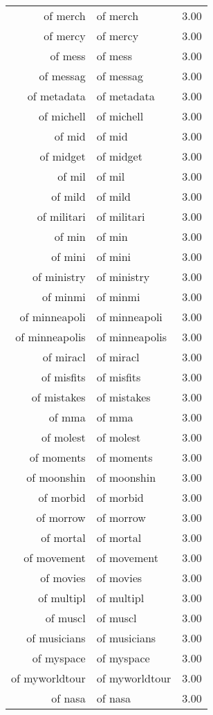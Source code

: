 \begin{table}[ht]
\begin{tabular}{rlr}
  of merch & of merch & 3.00 \\ 
  of mercy & of mercy & 3.00 \\ 
  of mess & of mess & 3.00 \\ 
  of messag & of messag & 3.00 \\ 
  of metadata & of metadata & 3.00 \\ 
  of michell & of michell & 3.00 \\ 
  of mid & of mid & 3.00 \\ 
  of midget & of midget & 3.00 \\ 
  of mil & of mil & 3.00 \\ 
  of mild & of mild & 3.00 \\ 
  of militari & of militari & 3.00 \\ 
  of min & of min & 3.00 \\ 
  of mini & of mini & 3.00 \\ 
  of ministry & of ministry & 3.00 \\ 
  of minmi & of minmi & 3.00 \\ 
  of minneapoli & of minneapoli & 3.00 \\ 
  of minneapolis & of minneapolis & 3.00 \\ 
  of miracl & of miracl & 3.00 \\ 
  of misfits & of misfits & 3.00 \\ 
  of mistakes & of mistakes & 3.00 \\ 
  of mma & of mma & 3.00 \\ 
  of molest & of molest & 3.00 \\ 
  of moments & of moments & 3.00 \\ 
  of moonshin & of moonshin & 3.00 \\ 
  of morbid & of morbid & 3.00 \\ 
  of morrow & of morrow & 3.00 \\ 
  of mortal & of mortal & 3.00 \\ 
  of movement & of movement & 3.00 \\ 
  of movies & of movies & 3.00 \\ 
  of multipl & of multipl & 3.00 \\ 
  of muscl & of muscl & 3.00 \\ 
  of musicians & of musicians & 3.00 \\ 
  of myspace & of myspace & 3.00 \\ 
  of myworldtour & of myworldtour & 3.00 \\ 
  of nasa & of nasa & 3.00 \\ 

\end{tabular}
\end{table}
